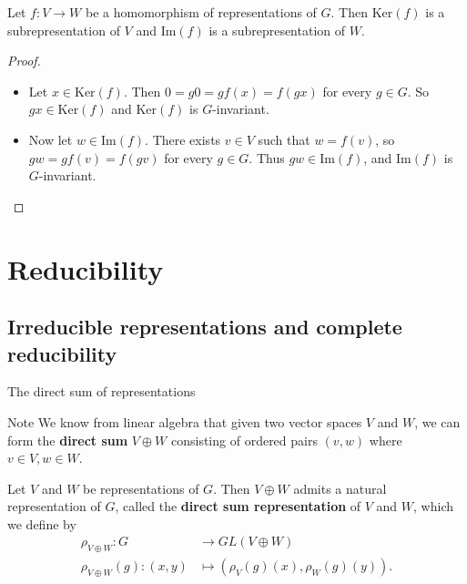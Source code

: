 \begin{frame}
\begin{proposition}\label{ker-im-subreprns}
Let $f \colon V \to W$ be a homomorphism of representations of $G$.  Then $\text{Ker}(f)$ is a subrepresentation of $V$ and $\text{Im}(f)$ is a subrepresentation of $W$.
\end{proposition}
\begin{proof}
\begin{itemize}
\item Let $x \in \text{Ker}(f)$. Then $0 = g0 = g f(x) = f(gx)$ for every $g \in G$.
So $gx \in \text{Ker}(f)$ and $\text{Ker}(f)$ is $G$-invariant.

\item Now let $w \in \text{Im}(f)$. There exists $v \in V$ such that $w = f(v)$, so $g w = g f(v) = f
(gv)$ for
every $g \in G$. Thus $gw \in \text{Im}(f)$, and $\text{Im}(f)$ is $G$-invariant.
\end{itemize}
\end{proof}
\end{frame}

\section{Reducibility}
\subsection{Irreducible representations and complete reducibility}
\begin{frame}{The direct sum of representations}
\begin{block}{Note}
We know from linear algebra that given two vector spaces $V$ and $W$, we can form the \textbf{direct sum} $V \oplus W$ consisting of ordered pairs $(v ,w)$ where $v \in V, w \in W$.  
\end{block} \pause
\begin{definition}
Let $V$ and $W$ be representations of $G$.  Then $V \oplus W$ admits a  natural representation of $G$, called the \textbf{direct sum representation} of $V$ and $W$, which we define by 
\begin{align*}
\rho_{V \oplus W} \colon G &\to GL(V \oplus W) \\
\rho_{V \oplus W}(g) \colon (x,y) &\mapsto (\rho_{V} (g)(x), \rho_{W}(g)(y)).
\end{align*}
\end{definition}
\end{frame}

